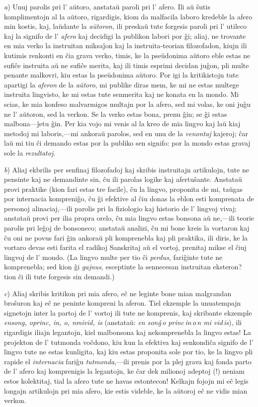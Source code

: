 \documentclass[ngerman,12pt,twoside]{book}
\begin{document}
\emph{a}) Unuj parolis pri l' aŭtoro, anstataŭ paroli pri l' afero. Ili aŭ ŝutis komplimentojn al la aŭtoro, rigardigis, kiom da malfacila laboro kredeble la afero min kostis, kaj, laŭdante la \emph{aŭtoron}, ili preskaŭ tute forgesis paroli pri l' utileco kaj la signifo de l' \emph{afero} kaj decidigi la publikon labori por ĝi; aliaj, ne trovante en mia verko la instruitan miksaĵon kaj la instruita-teorian filozofadon, kiujn ili kutimis renkonti en ĉia grava verko, timis, ke la pseŭdonima aŭtoro eble estas ne sufiĉe instruita aŭ ne sufiĉe merita, kaj ili timis esprimi decidan juĝon, pli multe penante malkovri, kiu estas la pseŭdonima aŭtoro. Por igi la kritikistojn tute apartigi la \emph{aferon} de la \emph{aŭtoro}, mi publike diras mem, ke mi ne estas multege instruita lingvisto, ke mi estas tute senmerita kaj ne konata en la mondo. Mi scias, ke mia konfeso malvarmigos multajn por la afero, sed mi volas, ke oni juĝu ne l' aŭtoron, sed la verkon. Se la verko estas bona, prenu ĝin; se ĝi estas malbona---ĵetu ĝin. Per kia vojo mi venis al la kreo de mia lingvo kaj laŭ kiaj metodoj mi laboris,---mi ankoraŭ parolos, sed en unu de la \emph{venontaj} kajeroj; ĉar laŭ mi tiu ĉi demando estas por la publiko sen signifo: por la mondo estas gravaj sole la \emph{rezultatoj}.

\emph{b}) Aliaj ekbrilis per senfinaj filozofadoj kaj skribis instruitajn artikulojn, tute ne pensinte kaj ne demandinte sin, ĉu ili parolas logike kaj afertuŝante. Anstataŭ provi praktike (kion fari estas tre facile), ĉu la lingvo, proponita de mi, taŭgas por internacia kompreniĝo, ĉu ĝi efektive al ĉiu donas la eblon esti komprenata de personoj alinaciaj,---ili parolis pri la fiziologio kaj historio de l' lingvoj vivaj; anstataŭ provi per ilia propra orelo, ĉu mia lingvo estas bonsona aŭ ne,---ili teorie parolis pri leĝoj de bonsoneco; anstataŭ analizi, ĉu mi bone kreis la vortaron kaj ĉu oni ne povus fari ĝin ankoraŭ pli komprenebla kaj pli praktika, ili diris, ke la vortaro devas esti farita el radikoj Sanskritaj aŭ el vortoj, prenitaj mikse el ĉiuj lingvoj de l' mondo. (La lingvo multe per tio ĉi \emph{perdus}, fariĝinte tute ne komprenebla; sed kion ĝi \emph{gajnus}, esceptinte la sennecesan instruitan eksteron? tion ĉi ili tute forgesis sin demandi.)

\emph{c}) Aliaj skribis kritikon pri mia afero, eĉ ne leginte bone mian malgrandan broŝuron kaj eĉ ne peninte kompreni la aferon. Tiel ekzemple la unuatempajn signetojn inter la partoj de l' vortoj ili tute ne komprenis, kaj skribante ekzemple \emph{\glqq{}ensong, oprinc, in, o, nmivid, is\grqq{}} (anstataŭ: \emph{\glqq{}en sonĝ\,o princ\,in\,o\,n mi vid\,is\grqq{}}), ili rigardigis iliajn legantojn, \glqq{}kiel malbonsona kaj nekomprenebla la lingvo estas\grqq{}! La projekton de l' tutmonda voĉdono, kiu kun la efektiva kaj senkondiĉa signifo de l' lingvo tute ne estas kunligita, kaj kiu estas proponita sole por tio, ke la lingvo pli rapide el \emph{internacia} fariĝu \emph{tutmonda},---ili prenis por la plej grava kaj fonda parto de l' afero kaj komprenigis la legantojn, ke \glqq{}ĉar dek milionoj adeptoj (!) neniam estos kolektitaj, tial la afero tute ne havas estontecon\grqq{}! Kelkajn fojojn mi eĉ legis longajn artikulojn pri mia afero, kie estis videble, ke la aŭtoroj eĉ ne vidis mian verkon.
\end{document}
